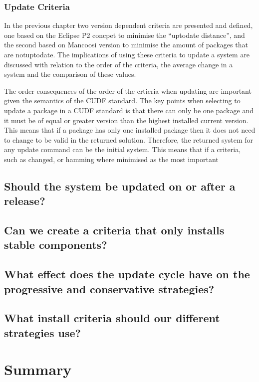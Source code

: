 \subsubsection{Update Criteria}
{}In the previous chapter two version dependent criteria are presented and defined, one based on the Eclipse P2 concpet to minimise the ``uptodate distance'', 
{}and the second based on Mancoosi version to minimise the amount of packages that are notuptodate. 
{}The implications of using these criteria to update a system are discussed with relation to the order of the criteria, the average change in a system and the comparison of these values.

The order consequences of the order of the crtieria when updating are important given the semantics of the CUDF standard.
The key points when selecting to update a package in a CUDF standard is that there can only be one package and it must be of equal or greater version than the highest installed current version.
This means that if a package has only one installed package then it does not need to change to be valid in the returned solution.
Therefore, the returned system for any update command can be the initial system.
This means that if a criteria, such as changed, or hamming where minimised as the most important  


\subsection{Should the system be updated on or after a release?}

\subsection{Can we create a criteria that only installs stable components?}

\subsection{What effect does the update cycle have on the progressive and conservative strategies?}

\subsection{What install criteria should our different strategies use?}


\section{Summary}
